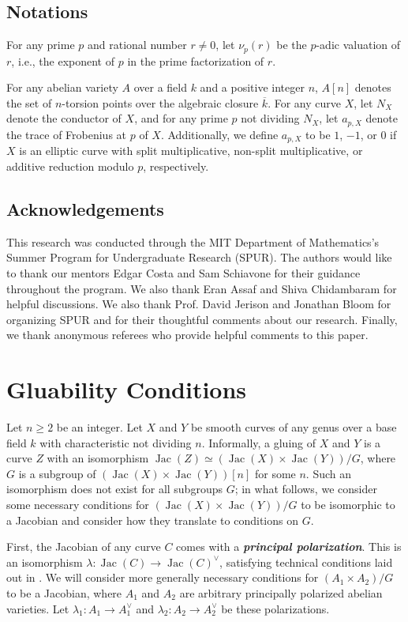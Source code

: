 \documentclass{amsproc}
\numberwithin{equation}{section}
\theoremstyle{definition}
\theoremstyle{remark}
\newcommand{\vocab}[1]{\textbf{\textit{\boldmath #1}}}
\DeclareMathOperator{\Jac}{Jac}
\begin{document}
\subsection{Notations}
For any prime $p$ and rational number $r\neq 0$, let $\nu_p(r)$ be the $p$-adic valuation of $r$, i.e., the exponent of $p$ in the prime factorization of $r$.

For any abelian variety $A$ over a field $k$ and a positive integer $n$, $A[n]$ denotes the set of $n$-torsion points over the algebraic closure $\overline k$.
For any curve $X$, let $N_X$ denote the conductor of $X$, and for any prime $p$ not dividing $N_X$, let $a_{p,X}$ denote the trace of Frobenius at $p$ of $X$.
Additionally, we define $a_{p,X}$ to be $1$, $-1$, or $0$ if $X$ is an elliptic curve with split multiplicative, non-split multiplicative, or additive reduction modulo $p$, respectively.

\subsection*{Acknowledgements}
This research was conducted through the MIT Department of Mathematics’s Summer Program for Undergraduate Research (SPUR). The authors would like to thank our mentors Edgar Costa and Sam Schiavone for their guidance throughout the program. We also thank Eran Assaf and Shiva Chidambaram for helpful discussions. We also thank Prof. David Jerison and Jonathan Bloom for organizing SPUR and for their thoughtful comments about our research. Finally, we thank anonymous referees who provide helpful comments to this paper.

\section{Gluability Conditions}
\label{sec:glue_condition}
Let $n\geq 2$ be an integer. Let $X$ and $Y$ be smooth curves of any genus over a base field $k$ with characteristic not dividing $n$. Informally, a gluing of $X$ and $Y$ is a curve $Z$ with an isomorphism $\Jac(Z) \simeq (\Jac(X) \times \Jac(Y))/G$, where $G$ is a subgroup of $(\Jac(X) \times \Jac(Y))[n]$ for some $n$. Such an isomorphism does not exist for all subgroups $G$; in what follows, we consider some necessary conditions for $(\Jac(X) \times \Jac(Y))/G$ to be isomorphic to a Jacobian and consider how they translate to conditions on $G$.


First, the Jacobian of any curve $C$ comes with a \vocab{principal polarization}. This is an isomorphism $\lambda: \Jac(C) \to \Jac(C)^\vee$, satisfying technical conditions laid out in \cite[\S 1.11]{milne_av}. We will consider more generally necessary conditions for $(A_1 \times A_2)/G$ to be a Jacobian, where $A_1$ and $A_2$ are arbitrary principally polarized abelian varieties. Let $\lambda_1: A_1 \to A_1^\vee$ and $\lambda_2: A_2 \to A_2^\vee$ be these polarizations.
\end{document}
